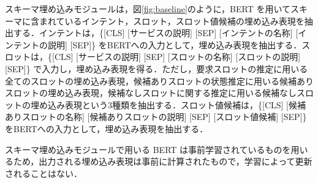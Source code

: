スキーマ埋め込みモジュールは，図\ref{fig:baseline}のように，BERT を用いてスキーマに含まれているインテント，スロット，スロット値候補の埋め込み表現を抽出する．インテントは，\{[CLS] [サービスの説明] [SEP] [インテントの名称] [インテントの説明] [SEP]\} をBERTへの入力として，埋め込み表現を抽出する．スロットは，\{[CLS] [サービスの説明] [SEP] [スロットの名称] [スロットの説明] [SEP]\} で入力し，埋め込み表現を得る．ただし，要求スロットの推定に用いる全てのスロットの埋め込み表現，候補ありスロットの状態推定に用いる候補ありスロットの埋め込み表現，候補なしスロットに関する推定に用いる候補なしスロットの埋め込み表現という3種類を抽出する．スロット値候補は，\{[CLS] [候補ありスロットの名称] [候補ありスロットの説明] [SEP] [スロット値候補] [SEP]\} をBERTへの入力として，埋め込み表現を抽出する．
\par
スキーマ埋め込みモジュールで用いる BERT は事前学習されているものを用いるため，出力される埋め込み表現は事前に計算されたもので，学習によって更新されることはない．